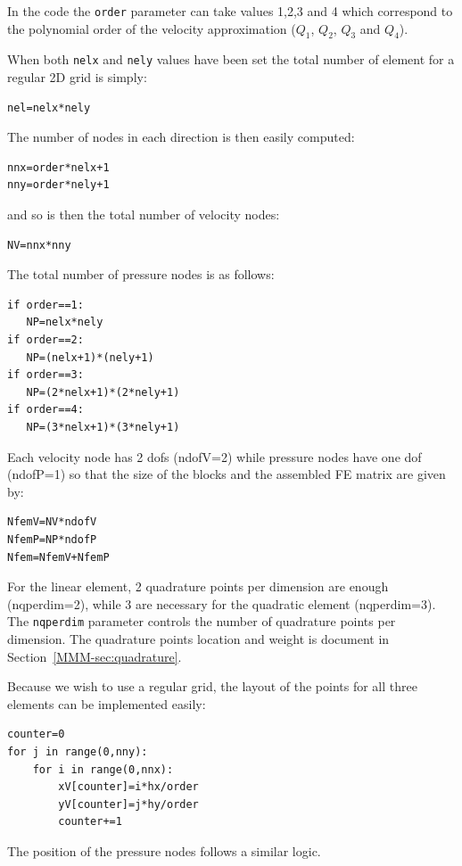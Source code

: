 In the code the \lstinline{order} parameter can take values 1,2,3 and 4 which 
correspond to the polynomial order of the velocity approximation ($Q_1$, $Q_2$, $Q_3$ and $Q_4$).

When both \lstinline{nelx} and \lstinline{nely} values have been set 
the total number of element for a regular 2D grid is simply:
\begin{lstlisting}
nel=nelx*nely
\end{lstlisting}

The number of nodes in each direction is then easily computed:
\begin{lstlisting}
nnx=order*nelx+1 
nny=order*nely+1 
\end{lstlisting}
and so is then the total number of velocity nodes:
\begin{lstlisting}
NV=nnx*nny
\end{lstlisting}

The total number of pressure nodes is as follows:
\begin{lstlisting}
if order==1:
   NP=nelx*nely
if order==2:
   NP=(nelx+1)*(nely+1)
if order==3:
   NP=(2*nelx+1)*(2*nely+1)
if order==4:
   NP=(3*nelx+1)*(3*nely+1)
\end{lstlisting}

Each velocity node has 2 dofs (ndofV=2) while pressure nodes have one dof (ndofP=1) so that 
the size of the blocks and the assembled FE matrix are given by:

\begin{lstlisting}
NfemV=NV*ndofV      
NfemP=NP*ndofP    
Nfem=NfemV+NfemP
\end{lstlisting}

For the linear element, 2 quadrature points per dimension are enough (nqperdim=2), 
while 3 are necessary for the quadratic element (nqperdim=3).
The \lstinline{nqperdim} parameter controls the number of quadrature points per
dimension.
The quadrature points location and weight is document in Section~\ref{MMM-sec:quadrature}.

Because we wish to use a regular grid, the layout of the points for all three elements 
can be implemented easily:

\begin{lstlisting}
counter=0    
for j in range(0,nny):
    for i in range(0,nnx):
        xV[counter]=i*hx/order
        yV[counter]=j*hy/order
        counter+=1
\end{lstlisting}

The position of the pressure nodes follows a similar logic.

